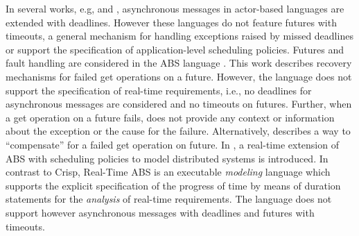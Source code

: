 In several works, e.g,  \cite{ACIHHS11} and \cite{Nielsen96r}, asynchronous messages in actor-based languages are extended with deadlines.
However these languages do not feature futures with timeouts, a general mechanism for handling exceptions raised by missed deadlines or
support the specification of application-level scheduling policies.
Futures and fault handling are considered in the ABS language \cite{abs:2012}.
This work describes recovery mechanisms  for  failed get operations on a future.
However,  the language does not support the specification of real-time requirements,
i.e., no  deadlines for asynchronous messages are  considered and no timeouts on futures.
Further, when a  get operation on a future fails,  \cite{abs:2012} does  not provide any context or information about the exception or the cause for the failure.
Alternatively, \cite{abs:2012} describes  a way to ``compensate'' for a failed get operation on future.
In  \cite{einar:rt:sched:co}, a real-time extension of  ABS with
scheduling policies to model distributed systems is introduced. 
In contrast to Crisp,  Real-Time ABS is an executable  \emph{modeling} language which supports the explicit specification
of the progress of time by means of duration statements for the \emph{analysis} of real-time requirements.
The language does not support however asynchronous messages with  deadlines and futures with timeouts.

